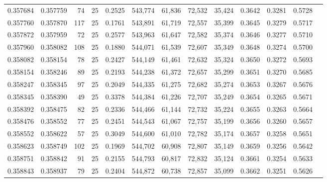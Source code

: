 \begin{tabular}{rrrrrrrrrrrrr}
0.357684 & 0.357759 &    74 &  25 &                                     0.2525 & 543,774 &  61,836 &  72,532 &  35,424 & 0.3642 & 0.3281 & 0.5728 \\
0.357760 & 0.357870 &   117 &  25 &                                     0.1761 & 543,891 &  61,719 &  72,557 &  35,399 & 0.3645 & 0.3279 & 0.5717 \\
0.357872 & 0.357959 &    72 &  25 &                                     0.2577 & 543,963 &  61,647 &  72,582 &  35,374 & 0.3646 & 0.3277 & 0.5710 \\
0.357960 & 0.358082 &   108 &  25 &                                     0.1880 & 544,071 &  61,539 &  72,607 &  35,349 & 0.3648 & 0.3274 & 0.5700 \\
0.358082 & 0.358154 &    78 &  25 &                                     0.2427 & 544,149 &  61,461 &  72,632 &  35,324 & 0.3650 & 0.3272 & 0.5693 \\
0.358154 & 0.358246 &    89 &  25 &                                     0.2193 & 544,238 &  61,372 &  72,657 &  35,299 & 0.3651 & 0.3270 & 0.5685 \\
0.358247 & 0.358345 &    97 &  25 &                                     0.2049 & 544,335 &  61,275 &  72,682 &  35,274 & 0.3653 & 0.3267 & 0.5676 \\
0.358345 & 0.358390 &    49 &  25 &                                     0.3378 & 544,384 &  61,226 &  72,707 &  35,249 & 0.3654 & 0.3265 & 0.5671 \\
0.358392 & 0.358475 &    82 &  25 &                                     0.2336 & 544,466 &  61,144 &  72,732 &  35,224 & 0.3655 & 0.3263 & 0.5664 \\
0.358476 & 0.358552 &    77 &  25 &                                     0.2451 & 544,543 &  61,067 &  72,757 &  35,199 & 0.3656 & 0.3260 & 0.5657 \\
0.358552 & 0.358622 &    57 &  25 &                                     0.3049 & 544,600 &  61,010 &  72,782 &  35,174 & 0.3657 & 0.3258 & 0.5651 \\
0.358623 & 0.358749 &   102 &  25 &                                     0.1969 & 544,702 &  60,908 &  72,807 &  35,149 & 0.3659 & 0.3256 & 0.5642 \\
0.358751 & 0.358842 &    91 &  25 &                                     0.2155 & 544,793 &  60,817 &  72,832 &  35,124 & 0.3661 & 0.3254 & 0.5633 \\
0.358843 & 0.358937 &    79 &  25 &                                     0.2404 & 544,872 &  60,738 &  72,857 &  35,099 & 0.3662 & 0.3251 & 0.5626 \\

\end{tabular}
